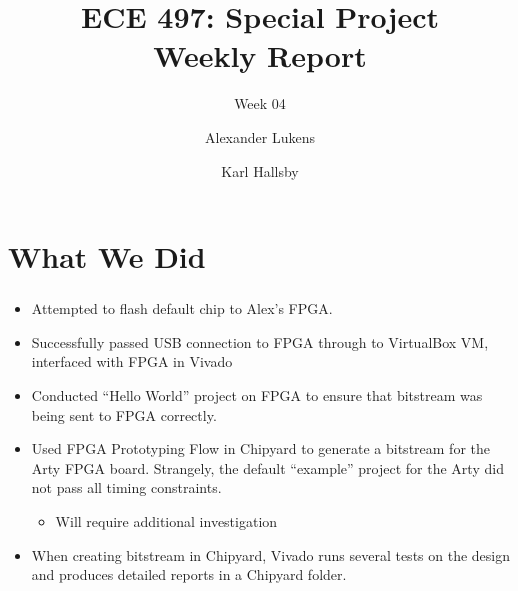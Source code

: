 \documentclass{../weeklyslides}
\title[Weekly Report]{ECE 497: Special Project \\ Weekly Report}
\subtitle{Week 04}
\author{Alexander Lukens \and Karl Hallsby}
\institute{Illinois Institute of Technology}
\date{\DTMdisplaydate{2021}{2}{18}{-1}}
\begin{document}
\nocite{chipyard}

\begin{frame}
  \titlepage{}
\end{frame}

\section{What We Did}\label{sec:What_We_Did}
\begin{frame}
  \frametitle{}
  \begin{itemize}
  \item Attempted to flash default chip to Alex's FPGA.\@
  \item Successfully passed USB connection to FPGA through to VirtualBox VM, interfaced with FPGA in Vivado
  \item Conducted ``Hello World'' project on FPGA to ensure that bitstream was being sent to FPGA correctly.
  \item Used FPGA Prototyping Flow in Chipyard to generate a bitstream for the Arty FPGA board.
    Strangely, the default ``example'' project for the Arty did not pass all timing constraints.
    \begin{itemize}
    \item Will require additional investigation
    \end{itemize}
  \item When creating bitstream in Chipyard, Vivado runs several tests on the design and produces detailed reports in a Chipyard folder.
  \end{itemize}
\end{frame}
\end{document}
